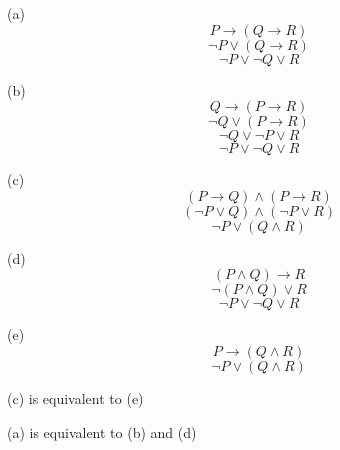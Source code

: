 \documentclass{article}
\begin{document}
(a) $$P \to (Q \to R)$$
$$\neg P \lor (Q \to R)$$
$$\neg P \lor \neg Q \lor R$$
\vspace{10pt}

(b) $$Q \to (P \to R)$$
$$\neg Q \lor (P \to R)$$
$$\neg Q \lor \neg P \lor R$$
$$\neg P \lor \neg Q \lor R$$

(c) $$(P \to Q) \land (P \to R)$$
$$(\neg P \lor Q) \land (\neg P \lor R)$$
$$\neg P \lor (Q \land R)$$

(d) $$(P \land Q) \to R$$
$$\neg (P \land Q) \lor R$$
$$\neg P \lor \neg Q \lor R$$

(e) $$P \to (Q \land R)$$
$$\neg P \lor (Q \land R)$$
\vspace{20pt}

(c) is equivalent to (e)

(a) is equivalent to (b) and (d)
\end{document}
